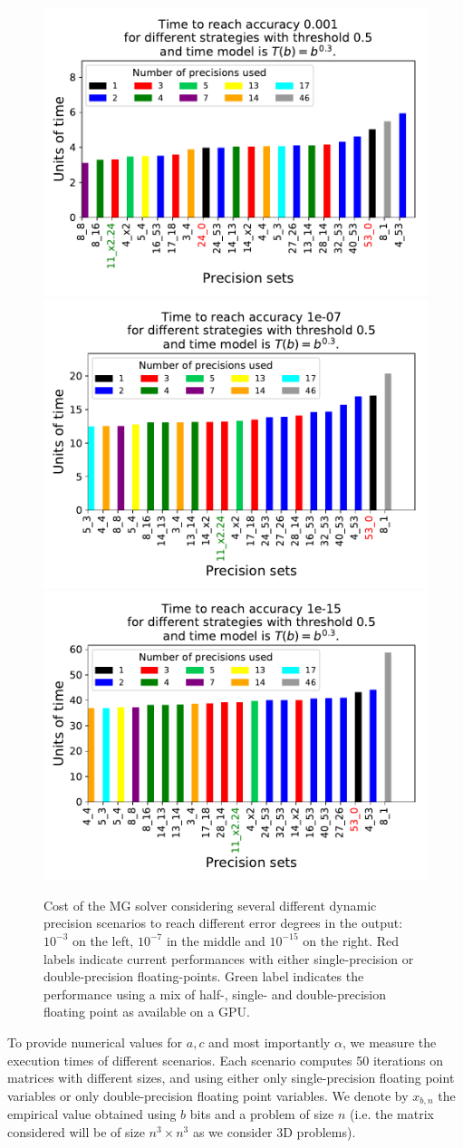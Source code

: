 \begin{figure}
    \includegraphics[width=0.33\linewidth]{figs/cost_3_2.pdf}
    \includegraphics[width=0.33\linewidth]{figs/cost_7_2.pdf}
    \includegraphics[width=0.33\linewidth]{figs/cost_15_2.pdf}
    \caption{Cost of the MG solver considering several different dynamic
    precision scenarios to reach different error degrees in the output:
    $10^{-3}$ on the left, $10^{-7}$ in the middle and $10^{-15}$ on the
    right. Red labels indicate current performances with either single-precision or double-precision floating-points. Green label indicates the
    performance using a mix of half-, single- and double-precision floating point as available on a GPU.}
    \label{fig.estimation1}
\end{figure}

To provide numerical values for $a,c$ and most importantly $\alpha$, we measure
the execution times of different scenarios. Each scenario computes 50
iterations on matrices with different sizes, and using either only
single-precision floating point variables or only double-precision floating
point variables. We denote by $x_{b,n}$ the empirical value obtained using $b$
bits and a problem of size $n$ (i.e. the matrix considered will be of size $n^3
\times n^3$ as we consider 3D problems).


